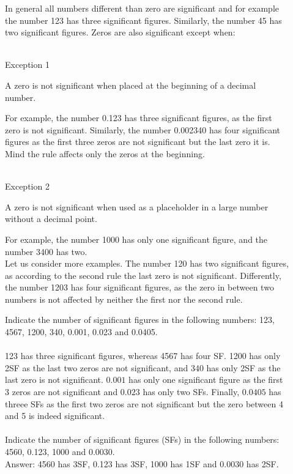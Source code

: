 \documentclass[main.tex]{subfiles}
\begin{document}
\begin{description}
\item[] In general all numbers different than zero are significant and for example the number 123 has three significant figures. Similarly, the number 45 has two significant figures. Zeros are also significant except when:\\
 \faCodeFork\ \begin{bf}Exception 1\end{bf}  \begin{it}A zero is not significant when placed at the beginning of a decimal number. \end{it} For example, the number 0.123 has three significant figures, as the first zero is not significant. Similarly, the number 0.002340 has four significant figures as the first three zeros are not significant but the last zero it is. Mind the rule affects only the zeros at the beginning.\\
 \faCodeFork\ \begin{bf}Exception 2\end{bf} \begin{it}A zero is not significant when used as a placeholder in a large number without a decimal point. \end{it} For example, the number 1000 has only one significant figure, and the number 3400 has two.\\
Let us consider more examples. The number 120 has two significant figures, as according to the second rule the last zero is not significant. Differently, the number 1203 has four significant figures, as the zero in between two numbers is not affected by neither the first nor the second rule.



\begin{example} %
Indicate the number of significant figures in the following numbers: 123, 4567, 1200, 340, 0.001, 0.023 and 0.0405.
\\
\\
123 has three significant figures, whereas 4567 has four SF. 1200 has only 2SF as the last two zeros are not significant, and 340 has only 2SF as the last zero is not significant. $0.001$ has only one significant figure as the first 3 zeros are not significant and $0.023$ has only two SFs. Finally, $0.0405$ has threee SFs as the first two zeros are not significant but the zero between 4 and 5 is indeed significant.\\
\faDiamond\ \\
Indicate the number of significant figures (SFs) in the following numbers: 4560, 0.123, 1000 and 0.0030. \\
\flushright Answer: 4560 has 3SF, 0.123 has 3SF, 1000 has 1SF and 0.0030 has 2SF.
\end{example}%


\end{description}
\end{document}

